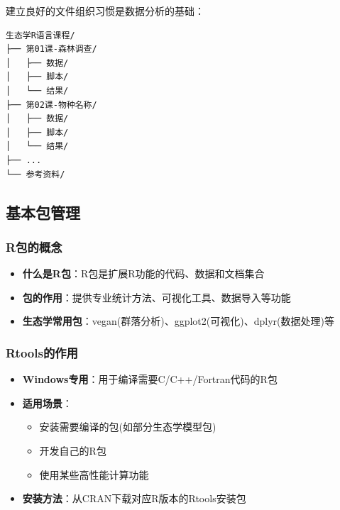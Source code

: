 \documentclass[
  twoside]{book}
\providecommand{\tightlist}{%
  \setlength{\itemsep}{0pt}\setlength{\parskip}{0pt}}
\begin{document}
建立良好的文件组织习惯是数据分析的基础：

\begin{verbatim}
生态学R语言课程/
├── 第01课-森林调查/
│   ├── 数据/
│   ├── 脚本/
│   └── 结果/
├── 第02课-物种名称/
│   ├── 数据/
│   ├── 脚本/
│   └── 结果/
├── ...
└── 参考资料/
\end{verbatim}

\hypertarget{ux57faux672cux5305ux7ba1ux7406}{%
\subsection{基本包管理}\label{ux57faux672cux5305ux7ba1ux7406}}

\hypertarget{rux5305ux7684ux6982ux5ff5}{%
\subsubsection{R包的概念}\label{rux5305ux7684ux6982ux5ff5}}

\begin{itemize}
\tightlist
\item
  \textbf{什么是R包}：R包是扩展R功能的代码、数据和文档集合
\item
  \textbf{包的作用}：提供专业统计方法、可视化工具、数据导入等功能
\item
  \textbf{生态学常用包}：vegan(群落分析)、ggplot2(可视化)、dplyr(数据处理)等
\end{itemize}

\hypertarget{rtoolsux7684ux4f5cux7528}{%
\subsubsection{Rtools的作用}\label{rtoolsux7684ux4f5cux7528}}

\begin{itemize}
\tightlist
\item
  \textbf{Windows专用}：用于编译需要C/C++/Fortran代码的R包
\item
  \textbf{适用场景}：

  \begin{itemize}
  \tightlist
  \item
    安装需要编译的包(如部分生态学模型包)
  \item
    开发自己的R包
  \item
    使用某些高性能计算功能
  \end{itemize}
\item
  \textbf{安装方法}：从CRAN下载对应R版本的Rtools安装包
\end{itemize}
\end{document}
